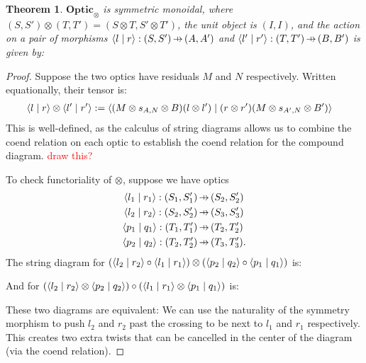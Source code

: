 \documentclass[11pt,letterpaper]{article}
\theoremstyle{plain}
\newtheorem{theorem}{Theorem}[subsection]
\theoremstyle{definition}
\newcommand{\Optic}{\mathbf{Optic}}
\newcommand{\rep}[2]{{\ensuremath \left\langle #1 \mid #2 \right\rangle}}
\newcommand{\hto}{\ensuremath{\,\mathaccent\shortmid\rightarrow\,}}
\newcommand{\todo}[1]{\textcolor{red}{\small #1}}
\begin{document}
\begin{theorem}
  $\Optic_\otimes$ is symmetric monoidal, where $(S, S') \otimes (T, T') = (S \otimes T, S' \otimes T')$, the unit object is $(I, I)$, and the action on a pair of morphisms $\rep{l}{r} : (S, S') \hto (A, A')$ and $\rep{l'}{r'} : (T, T') \hto (B, B')$ is given by:
  \begin{center}
    
  \end{center}
\end{theorem}
\begin{proof}
  Suppose the two optics have residuals $M$ and $N$ respectively. Written equationally, their tensor is:
  \begin{align*}
    \rep{l}{r} \otimes \rep{l'}{r'} &:= \rep{(M \otimes s_{A,N} \otimes B)(l \otimes l')}{(r \otimes r')(M \otimes s_{A',N} \otimes B')}
  \end{align*}
  This is well-defined, as the calculus of string diagrams allows us to combine the coend relation on each optic to establish the coend relation for the compound diagram. \todo{draw this?}

  To check functoriality of $\otimes$, suppose we have optics
  \begin{align*}
    \rep{l_1}{r_1} : (S_1, S_1') &\hto (S_2, S_2') \\
    \rep{l_2}{r_2} : (S_2, S_2') &\hto (S_3, S_3') \\
    \rep{p_1}{q_1} : (T_1, T_1') &\hto (T_2, T_2') \\
    \rep{p_2}{q_2} : (T_2, T_2') &\hto (T_3, T_3').
  \end{align*}
  The string diagram for $(\rep{l_2}{r_2} \circ \rep{l_1}{r_1}) \otimes (\rep{p_2}{q_2} \circ \rep{p_1}{q_1})$ is:
  \begin{center}
    
  \end{center}
  And for $(\rep{l_2}{r_2} \otimes \rep{p_2}{q_2}) \circ (\rep{l_1}{r_1} \otimes \rep{p_1}{q_1})$ is:
  \begin{center}
    
  \end{center}
  These two diagrams are equivalent: We can use the naturality of the symmetry morphism to push $l_2$ and $r_2$ past the crossing to be next to $l_1$ and $r_1$ respectively. This creates two extra twists that can be cancelled in the center of the diagram (via the coend relation).


\end{proof}
\end{document}
